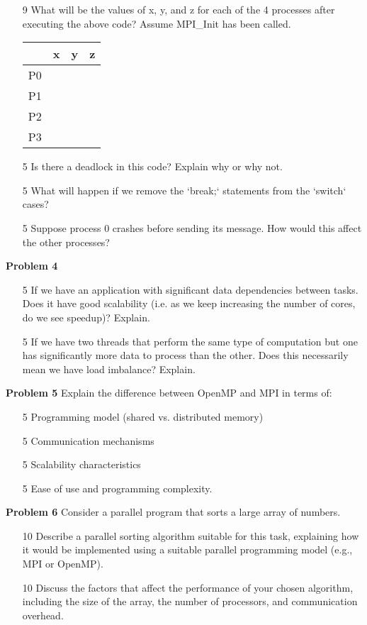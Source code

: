 \documentclass{article}
\begin{document}
\begin{enumerate}
    \item [9] What will be the values of x, y, and z for each of the 4 processes after executing the above code?  Assume MPI_Init has been called.
    \begin{tabular}{|c|c|c|c|}
        \hline
        & x & y & z \\
        \hline
        P0 & & & \\
        \hline
        P1 & & & \\
        \hline
        P2 & & & \\
        \hline
        P3 & & & \\
        \hline
    \end{tabular}
    \item [5]  Is there a deadlock in this code? Explain why or why not.
    \item [5] What will happen if we remove the `break;` statements from the `switch` cases?
    \item [5]  Suppose process 0 crashes before sending its message. How would this affect the other processes?
\end{enumerate}


\textbf{Problem 4}
\begin{enumerate}
    \item [5] If we have an application with significant data dependencies between tasks. Does it have good scalability (i.e. as we keep increasing the number of cores, do we see speedup)? Explain.
    \item [5] If we have two threads that perform the same type of computation but one has significantly more data to process than the other.  Does this necessarily mean we have load imbalance? Explain.
\end{enumerate}

\textbf{Problem 5}
Explain the difference between OpenMP and MPI in terms of:

\begin{enumerate}
    \item [5] Programming model (shared vs. distributed memory)
    \item [5] Communication mechanisms
    \item [5] Scalability characteristics
    \item [5] Ease of use and programming complexity.
\end{enumerate}

\textbf{Problem 6}
Consider a parallel program that sorts a large array of numbers.

\begin{enumerate}
    \item [10] Describe a parallel sorting algorithm suitable for this task, explaining how it would be implemented using a suitable parallel programming model (e.g., MPI or OpenMP).
    \item [10] Discuss the factors that affect the performance of your chosen algorithm, including the size of the array, the number of processors, and communication overhead.
\end{enumerate}
\end{document}
